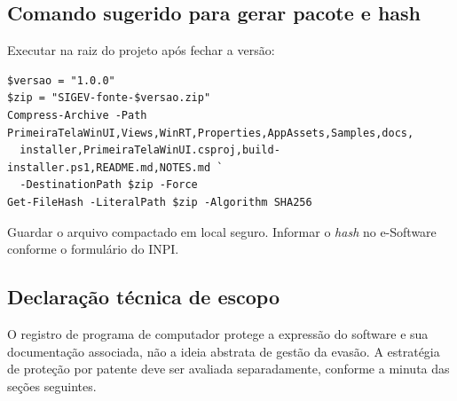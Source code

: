 \subsection{Comando sugerido para gerar pacote e hash}

Executar na raiz do projeto após fechar a versão:

\begin{verbatim}
$versao = "1.0.0"
$zip = "SIGEV-fonte-$versao.zip"
Compress-Archive -Path PrimeiraTelaWinUI,Views,WinRT,Properties,AppAssets,Samples,docs,
  installer,PrimeiraTelaWinUI.csproj,build-installer.ps1,README.md,NOTES.md `
  -DestinationPath $zip -Force
Get-FileHash -LiteralPath $zip -Algorithm SHA256
\end{verbatim}

Guardar o arquivo compactado em local seguro. Informar o \textit{hash} no e-Software conforme o formulário do INPI.

\subsection{Declaração técnica de escopo}

O registro de programa de computador protege a expressão do software e sua documentação associada, não a ideia abstrata de gestão da evasão. A estratégia de proteção por patente deve ser avaliada separadamente, conforme a minuta das seções seguintes.
